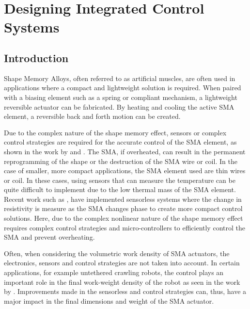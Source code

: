 
\chapter{Designing Integrated Control Systems}


\section{Introduction}
Shape Memory Alloys, often referred to as artificial muscles, are often used in applications where a compact and lightweight solution is required. When paired with a biasing element such as a spring or compliant mechanism, a lightweight reversible actuator can be fabricated. By heating and cooling the active SMA element, a reversible back and forth motion can be created.

Due to the complex nature of the shape memory effect, sensors or complex control strategies are required for the accurate control of the SMA element, as shown in the work by \todocite and \todocite. The SMA, if overheated, can result in the permanent reprogramming of the shape or the destruction of the SMA wire or coil. In the case of smaller, more compact applications, the SMA element used are thin wires or coil. In these cases, using sensors that can measure the temperature can be quite difficult to implement due to the low thermal mass of the SMA element. Recent work such as \todocite, have implemented sensorless systems where the change in resistivity is measure as the SMA changes phase to create more compact control solutions. Here, due to the complex nonlinear nature of the shape memory effect requires complex control strategies and micro-controllers to efficiently control the SMA and prevent overheating.

Often, when considering the volumetric work density of SMA actuators, the electronics, sensors and control strategies are not taken into account. In certain applications, for example untethered crawling robots, the control plays an important role in the final work-weight density of the robot as seen in the work by \todocite. Improvements made in the sensorless and control strategies can, thus, have a major impact in the final dimensions and weight of the SMA actuator.

